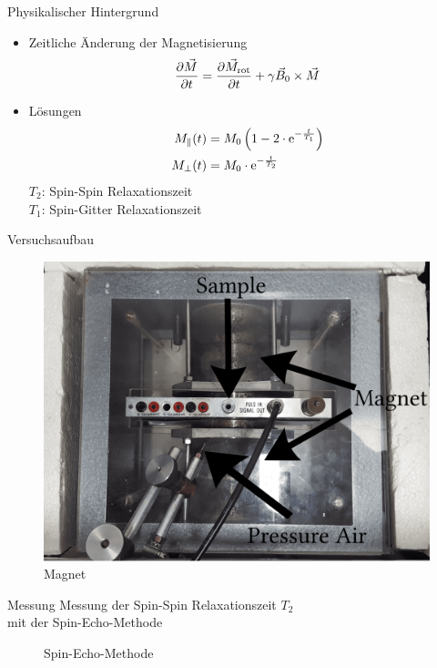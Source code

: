 \begin{frame}{Physikalischer Hintergrund}
	\begin{itemize}
	\item Zeitliche Änderung der Magnetisierung
	\begin{align*}
	\pdv{\vec{M}}{t}=\pdv{\vec{M}_\text{rot}}{t}+\gamma\vec{B}_0\times\vec{M}
	\end{align*}
	\item Lösungen
	\begin{align*}
	M_\parallel (t)&=M_0\left(1-2\cdot\mathrm{e}^{-\frac{t}{T_1}}\right)\\
	M_\bot(t)&=M_0\cdot\mathrm{e}^{-\frac{t}{T_2}}
	\end{align*}
	$T_{2}$: Spin-Spin Relaxationszeit\\
	$T_{1}$: Spin-Gitter Relaxationszeit
	\end{itemize}
\end{frame}

\begin{frame}{Versuchsaufbau}
	\begin{figure}
	\centering
	\includegraphics[scale=.075]{images//magnet.png}
	\caption{Magnet}
	\end{figure}
\end{frame}

\begin{frame}{Messung}
Messung der Spin-Spin Relaxationszeit $T_2$\\mit der Spin-Echo-Methode
	\begin{figure}
	\centering
	
	\caption{Spin-Echo-Methode}
	\end{figure}
\end{frame}

